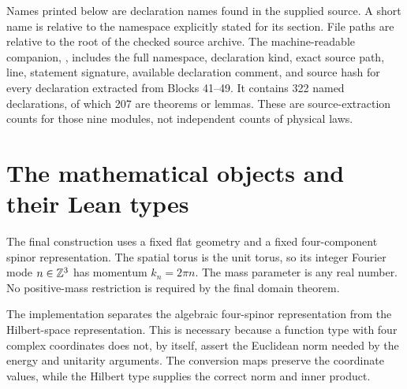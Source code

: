 Names printed below are declaration names found in the supplied source. A short name is relative to the namespace explicitly stated for its section. File paths are relative to the root of the checked source archive. The machine-readable companion, , includes the full namespace, declaration kind, exact source path, line, statement signature, available declaration comment, and source hash for every declaration extracted from Blocks 41--49. It contains 322 named declarations, of which 207 are theorems or lemmas. These are source-extraction counts for those nine modules, not independent counts of physical laws.

\section{The mathematical objects and their Lean types}

The final construction uses a fixed flat geometry and a fixed four-component spinor representation. The spatial torus is the unit torus, so its integer Fourier mode \(n\in\mathbb Z^3\) has momentum \(k_n=2\pi n\). The mass parameter is any real number. No positive-mass restriction is required by the final domain theorem.

The implementation separates the algebraic four-spinor representation from the Hilbert-space representation. This is necessary because a function type with four complex coordinates does not, by itself, assert the Euclidean norm needed by the energy and unitarity arguments. The conversion maps preserve the coordinate values, while the Hilbert type supplies the correct norm and inner product.

